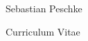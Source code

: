 \documentclass[
    10pt, %
]{FreemanCV}
\begin{document}
    \begin{paracol}{2} %


        \parbox[][0.11\textheight][c]{\linewidth}{ %
            \centering %

            {\sffamily\Huge Sebastian Peschke} %

            \medskip %

            {\cursivefont\Huge\textcolor{headings}{Curriculum Vitae}}

            \vfill %
        }


        







\end{paracol}
\end{document}
